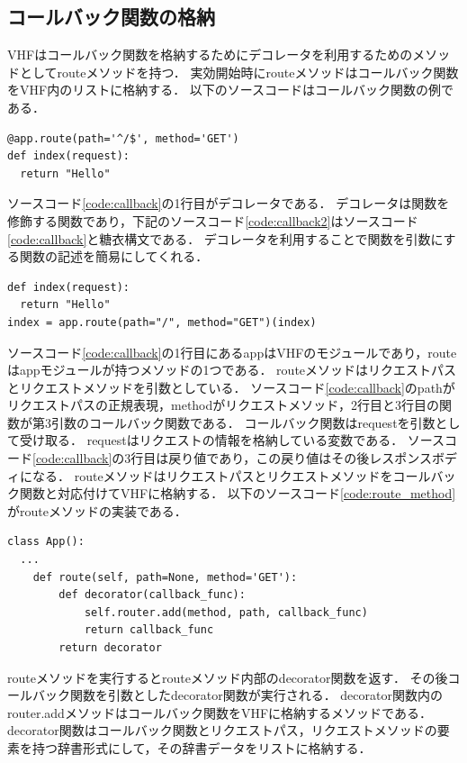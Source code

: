 \documentclass[a4paper,12pt]{jreport}
\begin{document}
\subsection{コールバック関数の格納}
VHFはコールバック関数を格納するためにデコレータを利用するためのメソッドとしてrouteメソッドを持つ．
実効開始時にrouteメソッドはコールバック関数をVHF内のリストに格納する．
以下のソースコードはコールバック関数の例である．
\begin{lstlisting}[caption={コールバック関数の一例}, label=code:callback, captionpos=b]
@app.route(path='^/$', method='GET')
def index(request):
  return "Hello"
\end{lstlisting}
ソースコード\ref{code:callback}の1行目がデコレータである．
デコレータは関数を修飾する関数であり，下記のソースコード\ref{code:callback2}はソースコード\ref{code:callback}と糖衣構文である．
デコレータを利用することで関数を引数にする関数の記述を簡易にしてくれる．
\begin{lstlisting}[caption={ソースコード\ref{code:callback}と糖衣な表現}, label=code:callback2, captionpos=b]
def index(request):
  return "Hello"
index = app.route(path="/", method="GET")(index)
\end{lstlisting}
ソースコード\ref{code:callback}の1行目にあるappはVHFのモジュールであり，routeはappモジュールが持つメソッドの1つである．
routeメソッドはリクエストパスとリクエストメソッドを引数としている．
ソースコード\ref{code:callback}のpathがリクエストパスの正規表現，methodがリクエストメソッド，2行目と3行目の関数が第3引数のコールバック関数である．
コールバック関数はrequestを引数として受け取る．
requestはリクエストの情報を格納している変数である．
ソースコード\ref{code:callback}の3行目は戻り値であり，この戻り値はその後レスポンスボディになる．
routeメソッドはリクエストパスとリクエストメソッドをコールバック関数と対応付けてVHFに格納する．
以下のソースコード\ref{code:route_method}がrouteメソッドの実装である．
\begin{lstlisting}[caption={routeメソッド}, label=code:route_method, captionpos=b]
class App():
  ...
    def route(self, path=None, method='GET'):
        def decorator(callback_func):
            self.router.add(method, path, callback_func)
            return callback_func
        return decorator
\end{lstlisting}
routeメソッドを実行するとrouteメソッド内部のdecorator関数を返す．
その後コールバック関数を引数としたdecorator関数が実行される．
decorator関数内のrouter.addメソッドはコールバック関数をVHFに格納するメソッドである．
decorator関数はコールバック関数とリクエストパス，リクエストメソッドの要素を持つ辞書形式にして，その辞書データをリストに格納する．
\end{document}
